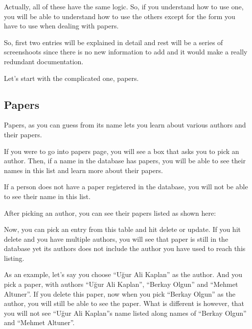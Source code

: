 \documentclass[letterpaper,10pt,english]{sphinxmanual}
\begin{document}
Actually, all of these have the same logic. So, if you understand how
to use one, you will be able to understand how to use the others except
for the form you have to use when dealing with papers.

So, first two entries will be explained in detail and rest will be a series
of screenshoots since there is no new information to add and it would make
a really redundant documentation.

Let’s start with the complicated one, papers.


\subsection{Papers}
\label{\detokenize{user/kaplan:papers}}
Papers, as you can guess from its name lets you learn about various
authors and their papers.

If you were to go into papers page, you will see a box that asks you
to pick an author. Then, if a name in the database has papers, you will
be able to see their names in this list and learn more about their papers.

\begin{figure}[htbp]
\centering

\noindent{}
\end{figure}

If a person does not have a paper registered in the database, you will not
be able to see their name in this list.

After picking an author, you can see their papers listed as shown here:

\begin{figure}[htbp]
\centering

\noindent{}
\end{figure}

Now, you can pick an entry from this table and hit delete or update. If you
hit delete and you have multiple authors, you will see that paper is still in
the database yet its authors does not include the author you have used to
reach this listing.

As an example, let’s say you choose “Uğur Ali Kaplan” as the author. And you
pick a paper, with authors “Uğur Ali Kaplan”, “Berkay Olgun” and “Mehmet Altuner”.
If you delete this paper, now when you pick “Berkay Olgun” as the author, you will
still be able to see the paper. What is different is however, that you will not
see “Uğur Ali Kaplan”s name listed along names of “Berkay Olgun” and “Mehmet Altuner”.
\end{document}
